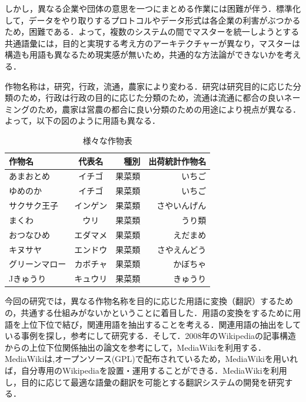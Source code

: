 しかし，異なる企業や団体の意思を一つにまとめる作業には困難が伴う．標準化して，データをやり取りするプロトコルやデータ形式は各企業の利害がぶつかるため，困難である\cite{kizi2015}．よって，複数のシステムの間でマスターを統一しようとする共通語彙には，目的と実現する考え方のアーキテクチャーが異なり，マスターは構造も用語も異なるため現実感が無いため，共通的な方法論ができないかを考える．

作物名称は，研究，行政，流通，農家により変わる．研究は研究目的に応じた分類のため，行政は行政の目的に応じた分類のため，流通は流通に都合の良いネーミングのため，農家は営農の都合に良い分類のための用途により視点が異なる．よって，以下の図のように用語も異なる．

\begin{table}[htb]
  \begin{center}
  \begin{tabular}{|l|c|r|r|} \hline
    作物名 & 代表名 & 種別 & 出荷統計作物名 \\ \hline \hline
    あまおとめ & イチゴ & 果菜類 & いちご \\  \hline
    ゆめのか & イチゴ & 果菜類 & いちご \\  \hline
    サクサク王子 & インゲン & 果菜類 & さやいんげん \\  \hline
    まくわ & ウリ & 果菜類 & うり類 \\  \hline
    おつなひめ & エダマメ & 果菜類 & えだまめ \\  \hline
    キヌサヤ & エンドウ & 果菜類 & さやえんどう \\  \hline
    グリーンマロー & カボチャ & 果菜類 & かぼちゃ \\  \hline
   Jきゅうり & キュウリ & 果菜類 & きゅうり \\  \hline
  \end{tabular}
  \end{center}
\caption{様々な作物表}
\end{table}

今回の研究では，異なる作物名称を目的に応じた用語に変換（翻訳）するための，共通する仕組みがないかということに着目した．用語の変換をするために用語を上位下位で結び，関連用語を抽出することを考える．関連用語の抽出をしている事例を探し，参考にして研究する．そして．2008年のWikipediaの記事構造からの上位下位関係抽出の論文を参考にして，MediaWikiを利用する\cite{nogyo2015}．MediaWikiは,オープンソース(GPL)で配布されているため，MediaWikiを用いれば，自分専用のWikipediaを設置・運用することができる\cite{nico2015}．MediaWikiを利用し，目的に応じて最適な語彙の翻訳を可能とする翻訳システムの開発を研究する．


